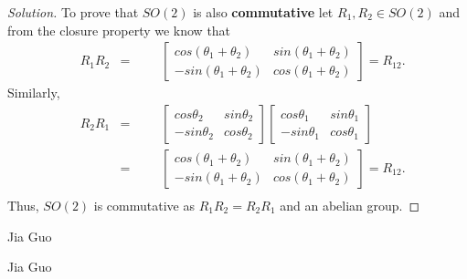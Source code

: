 \documentclass[12pt]{article}
\newenvironment{problem}[2][Problem]{\begin{trivlist}
\item[\hskip \labelsep {\bfseries #1}\hskip \labelsep {\bfseries #2.}]}{\end{trivlist}}
\newenvironment{solution}{\begin{proof}[Solution]}{\end{proof}}
\begin{document}
\begin{solution}
To prove that $SO(2)$ is also \textbf{commutative} let $R_1,R_2 \in SO(2)$ and from the closure property we know that 
\begin{equation*}
\begin{aligned}
& R_1 R_2
&  =
&&&  \begin{bmatrix}
cos(\theta_1+\theta_2) & sin(\theta_1+\theta_2) \\
-sin(\theta_1+\theta_2) & cos(\theta_1+\theta_2)
\end{bmatrix}=R_{12}.
\end{aligned}
\end{equation*}
Similarly,
\begin{equation*}
\begin{aligned}
& R_2 R_1
&  =
&&& \begin{bmatrix}
cos\theta_2 & sin\theta_2 \\
-sin\theta_2 & cos\theta_2
\end{bmatrix}\begin{bmatrix}
cos\theta_1 & sin\theta_1 \\
-sin\theta_1 & cos\theta_1
\end{bmatrix}\\
&& =
&&&  \begin{bmatrix}
cos(\theta_1+\theta_2) & sin(\theta_1+\theta_2) \\
-sin(\theta_1+\theta_2) & cos(\theta_1+\theta_2)
\end{bmatrix}=R_{12}.\\
\end{aligned}
\end{equation*}
Thus, $SO(2)$ is commutative as $R_1R_2=R_2R_1$ and an abelian group.
\end{solution}



\begin{problem}{2} %
Jia Guo 
\end{problem}



\begin{problem}{3} %
Jia Guo
\end{problem}
\end{document}
